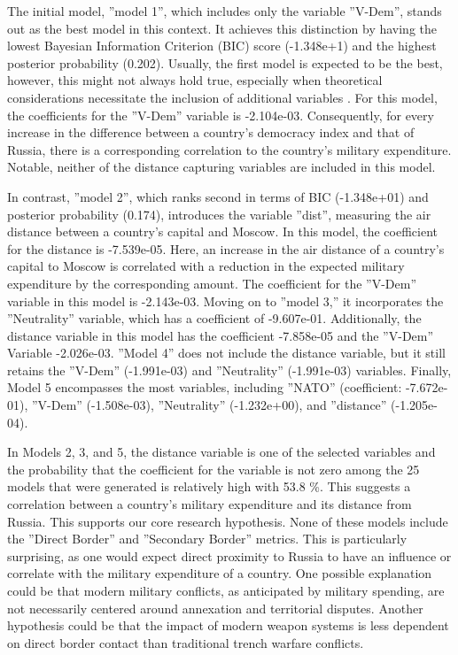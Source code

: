 \documentclass[12pt,a4paper]{article}
\begin{document}
The initial model, ''model 1'', which includes only the variable ''V-Dem'', stands out as the best model in this context. It achieves this distinction by having the lowest Bayesian Information Criterion (BIC) score (-1.348e+1) and the highest posterior probability (0.202). Usually, the first model is expected to be the best, however, this might not always hold true, especially when theoretical considerations necessitate the inclusion of additional variables \citep{starkweather2011}. For this model, the coefficients for the ''V-Dem'' variable is -2.104e-03. Consequently, for every increase in the difference between a country's democracy index and that of Russia, there is a corresponding correlation to the country's military expenditure. Notable, neither of the distance capturing variables are included in this model. 

In contrast, ''model 2'', which ranks second in terms of BIC (-1.348e+01) and posterior probability (0.174), introduces the variable ''dist'', measuring the air distance between a country's capital and Moscow. In this model, the coefficient for the distance is -7.539e-05. Here, an increase in the air distance of a country's capital to Moscow is correlated with a reduction in the expected military expenditure by the corresponding amount. The coefficient for the ''V-Dem'' variable in this model is -2.143e-03. Moving on to ''model 3,'' it incorporates the ''Neutrality'' variable, which has a coefficient of -9.607e-01. Additionally, the distance variable in this model has the coefficient -7.858e-05 and the ''V-Dem'' Variable -2.026e-03. ''Model 4'' does not include the distance variable, but it still retains the ''V-Dem'' (-1.991e-03) and ''Neutrality'' (-1.991e-03) variables. Finally, Model 5 encompasses the most variables, including ''NATO'' (coefficient: -7.672e-01), ''V-Dem'' (-1.508e-03), ''Neutrality'' (-1.232e+00), and ''distance'' (-1.205e-04).

In Models 2, 3, and 5, the distance variable is one of the selected variables and the probability that the coefficient for the variable is not zero among the 25 models that were generated is relatively high with 53.8 \%. This suggests a correlation between a country's military expenditure and its distance from Russia. This supports our core research hypothesis. None of these models include the ''Direct Border'' and ''Secondary Border'' metrics. This is particularly surprising, as one would expect direct proximity to Russia to have an influence or correlate with the military expenditure of a country. One possible explanation could be that modern military conflicts, as anticipated by military spending, are not necessarily centered around annexation and territorial disputes. Another hypothesis could be that the impact of modern weapon systems is less dependent on direct border contact than traditional trench warfare conflicts.
\end{document}
